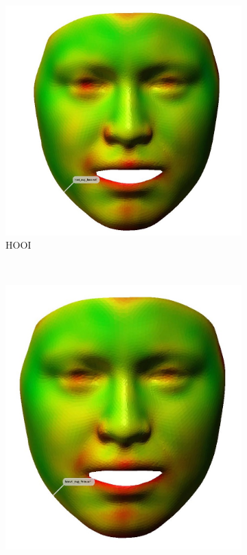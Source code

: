 \begin{figure}
        \centering
        \begin{subfigure}[b]{0.6\textwidth}
                \includegraphics[width=\textwidth]{images/hooi_avg_face.jpg}
                \caption{HOOI}
                \label{HOOI_face}
        \end{subfigure}%
        ~ %
        \begin{subfigure}[b]{0.55\textwidth}
                \includegraphics[width=\textwidth]{images/hosvd_avg_face.jpg}

\end{subfigure}
\end{figure}
